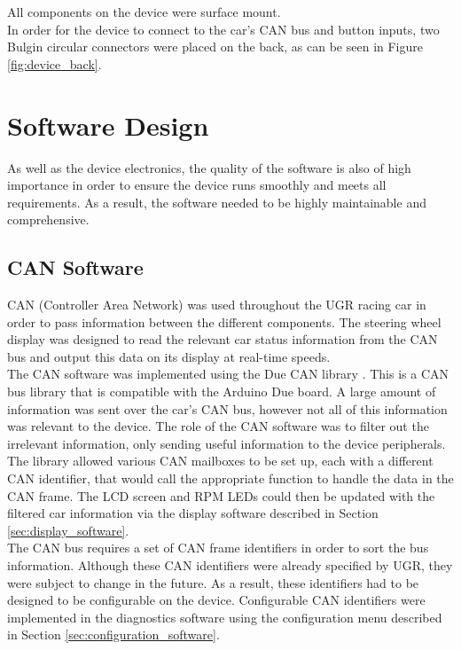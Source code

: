 \documentclass[a4paper,12pt]{article}
\begin{document}
All components on the device were surface mount. \\

In order for the device to connect to the car's CAN bus and button inputs, two Bulgin circular connectors were placed on the back, as can be seen in Figure \ref{fig:device_back}.




\newpage
\section{Software Design}
\label{sec:software_design}

As well as the device electronics, the quality of the software is also of high importance in order to ensure the device runs smoothly and meets all requirements. As a result, the software needed to be highly maintainable and comprehensive.

\subsection{CAN Software}
\label{sec:CAN_software}

CAN (Controller Area Network) was used throughout the UGR racing car in order to pass information between the different components. The steering wheel display was designed to read the relevant car status information from the CAN bus and output this data on its display at real-time speeds. \\

The CAN software was implemented using the Due CAN library \cite{due_can}. This is a CAN bus library that is compatible with the Arduino Due board. A large amount of information was sent over the car’s CAN bus, however not all of this information was relevant to the device. The role of the CAN software was to filter out the irrelevant information, only sending useful information to the device peripherals. The library allowed various CAN mailboxes to be set up, each with a different CAN identifier, that would call the appropriate function to handle the data in the CAN frame. The LCD screen and RPM LEDs could then be updated with the filtered car information via the display software described in Section \ref{sec:display_software}. \\

The CAN bus requires a set of CAN frame identifiers in order to sort the bus information. Although these CAN identifiers were already specified by UGR, they were subject to change in the future. As a result, these identifiers had to be designed to be configurable on the device. Configurable CAN identifiers were implemented in the diagnostics software using the configuration menu described in Section \ref{sec:configuration_software}.
\end{document}
